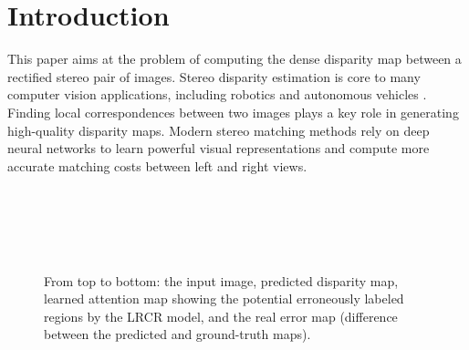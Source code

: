 \documentclass[10pt,twocolumn,letterpaper]{article}
\begin{document}
\vspace{-0.5cm}
\section{Introduction}

This paper aims at the problem of computing the dense disparity map between a rectified stereo pair of images. Stereo disparity estimation is   core to many computer vision applications, including robotics and autonomous vehicles  \cite{geiger2013vision, Geiger2012CVPR, maddern2016real}.  Finding local correspondences between two images plays a key role in generating high-quality disparity maps.  Modern   stereo matching methods rely on deep neural networks to learn powerful visual representations and compute  more accurate  matching costs between  left and right views.

\begin{figure}
	\captionsetup[subfigure]{labelformat=empty}
	\centering
	\\
	\vspace{-0.75cm}
	\\
	\vspace{-0.75cm}
	\\
	\vspace{-0.75cm}
	\\
	\vspace{-0.5cm}
	\caption{From top to bottom: the input image,  predicted disparity map, learned attention map showing the potential erroneously labeled regions by the LRCR model, and the real error map (difference between the predicted and ground-truth maps).}
	\vspace{-0.7cm}
	\label{fig:fig1}
	
\end{figure}
\end{document}
